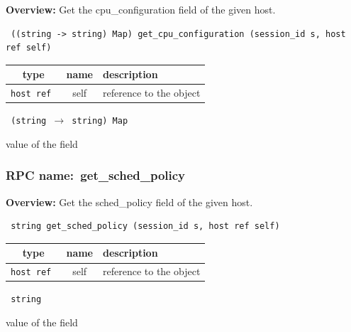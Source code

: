 {\bf Overview:} 
Get the cpu\_configuration field of the given host.

\begin{verbatim} ((string -> string) Map) get_cpu_configuration (session_id s, host ref self)\end{verbatim}



 
\vspace{0.3cm}
\begin{tabular}{|c|c|p{7cm}|}
 \hline
{\bf type} & {\bf name} & {\bf description} \\ \hline
{\tt host ref } & self & reference to the object \\ \hline 

\end{tabular}

\vspace{0.3cm}

{\tt 
(string $\rightarrow$ string) Map
}


value of the field
\vspace{0.3cm}
\vspace{0.3cm}
\vspace{0.3cm}
\subsubsection{RPC name:~get\_sched\_policy}

{\bf Overview:} 
Get the sched\_policy field of the given host.

\begin{verbatim} string get_sched_policy (session_id s, host ref self)\end{verbatim}



 
\vspace{0.3cm}
\begin{tabular}{|c|c|p{7cm}|}
 \hline
{\bf type} & {\bf name} & {\bf description} \\ \hline
{\tt host ref } & self & reference to the object \\ \hline 

\end{tabular}

\vspace{0.3cm}

{\tt 
string
}


value of the field
\vspace{0.3cm}
\vspace{0.3cm}
\vspace{0.3cm}
